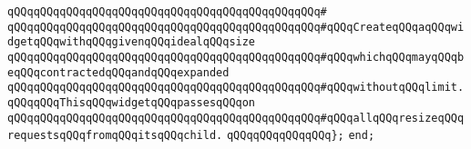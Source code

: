 \verb|qQQqqQQqqQQqqQQqqQQqqQQqqQQqqQQqqQQqqQQqqQQqqQQq#|\newline
\verb|qQQqqQQqqQQqqQQqqQQqqQQqqQQqqQQqqQQqqQQqqQQqqQQq#qQQqCreateqQQqaqQQqwidgetqQQqwithqQQqgivenqQQqidealqQQqsize|\newline
\verb|qQQqqQQqqQQqqQQqqQQqqQQqqQQqqQQqqQQqqQQqqQQqqQQq#qQQqwhichqQQqmayqQQqbeqQQqcontractedqQQqandqQQqexpanded|\newline
\verb|qQQqqQQqqQQqqQQqqQQqqQQqqQQqqQQqqQQqqQQqqQQqqQQq#qQQqwithoutqQQqlimit.qQQqqQQqThisqQQqwidgetqQQqpassesqQQqon|\newline
\verb|qQQqqQQqqQQqqQQqqQQqqQQqqQQqqQQqqQQqqQQqqQQqqQQq#qQQqallqQQqresizeqQQqrequestsqQQqfromqQQqitsqQQqchild.|\newline
\verb|qQQqqQQqqQQqqQQq};|\newline
\newline
\verb|end;|\newline

